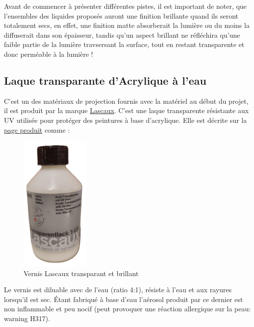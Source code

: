 Avant de commencer à présenter différentes pistes, il est important de noter, que l'ensembles des liquides proposés auront une finition brillante
quand ils seront totalement secs, en effet, une finition matte absorberait la lumière ou du moins la diffuserait dans son épaisseur, tandis qu'un aspect brillant
ne réfléchira qu'une faible partie de la lumière travsersant la surface, tout en restant transparente et donc perméable à la lumière !
\subsection{Laque transparante d'Acrylique à l'eau}

C'est un des matériaux de projection fournis avec la matériel au début du projet, il est produit par la marque \href{https://lascaux.ch/en/start}{Lascaux}\footnotemark {}.
C'est une laque transparente résistante aux UV utilisée pour protéger des peintures à base d'acrylique. Elle est décrite sur la \href{https://lascaux.ch/lascaux-varnishes-and-fixative/lascaux-transparent-varnish-1-uv-gloss}{page produit}\footnotemark
comme :

\begin{figure}[H]
    \centering
    \includegraphics[width=0.3\textwidth]{assets/figures/etat_art/Lascaux_vernis_brillant.png}
    \caption[Vernis Lascaux transparant et brillant]{Vernis Lascaux transparant et brillant}
\end{figure}
Le vernis est diluable avec de l'eau (ratio 4:1), résiste à l'eau et aux rayures lorsqu'il est sec. Étant fabriqué à base d'eau
l'aérosol produit par ce dernier est non inflammable et peu nocif (peut provoquer une réaction allergique sur la peau: warning H317).

